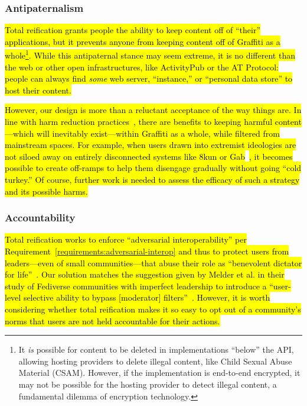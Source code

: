 \subsubsection{Antipaternalism}

\hl{%
Total reification grants people the ability to keep content off of ``their'' applications,
but it prevents anyone from keeping content off of Graffiti as a whole\footnote{%
It \emph{is} possible for content to be deleted in implementations ``below'' the API,
allowing hosting providers to delete illegal content,
like Child Sexual Abuse Material (CSAM).
However, if the implementation is end-to-end encrypted,
it may not be possible for the hosting provider to
detect illegal content,
a fundamental dilemma of encryption technology.
}.
While this antipaternal stance may seem extreme,
it is no different than the web or other open infrastructures,
like ActivityPub or the AT Protocol:
people can always find \emph{some}
web server, ``instance,''
or ``personal data store'' to host their content.
}%

\hl{%
However, our design is more than a reluctant acceptance of the way things are.
In line with harm reduction practices~\expandafter{\expandafter\cite{harmreduction}},
there are benefits to keeping harmful content---which will inevitably
exist---within Graffiti as a whole, while filtered from mainstream spaces.
For example, when users drawn into extremist ideologies are not
siloed away on entirely disconnected systems
like 8kun or Gab}~\cite{8kun,gab}\hl{, it becomes possible to create off-ramps
to help them disengage gradually without going ``cold turkey.''
Of course, further work is needed to assess the efficacy of
such a strategy and its possible harms.
}%


\subsubsection{Accountability}

\hl{%
Total reification works to enforce ``adversarial interoperability''
per Requirement~{\ref{requirements:adversarial-interop}}
and thus to protect users from leaders---even of small communities---that abuse their role as
``benevolent dictator for life''~{\cite{governablespaces}}.
Our solution matches the suggestion given by Melder et al.
in their study of Fediverse communities with imperfect leadership
to introduce a ``user-level selective ability to bypass [moderator] filters''~{\cite{blocklistboundary}}.
However, it is worth considering whether total reification makes it so easy
to opt out of a community's norms that users are not held accountable for their actions.
}%

